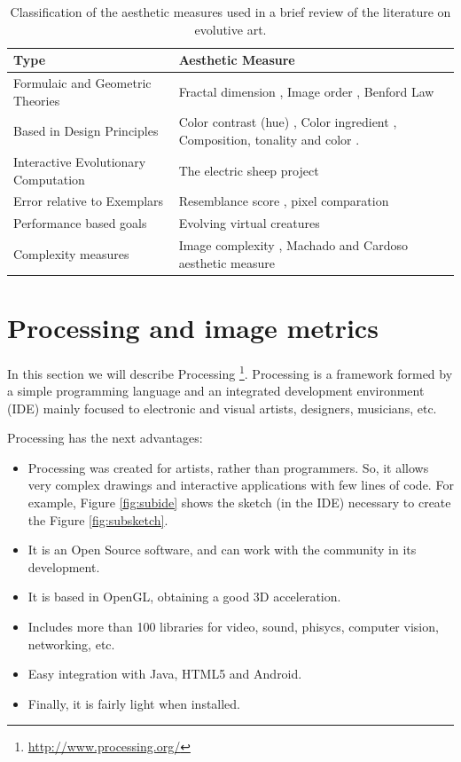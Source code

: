 \documentclass[conference]{IEEEtran}
\begin{document}
\begin{table}[!t] 
\caption{Classification of the aesthetic measures used in a brief review of the literature on evolutive art.} 
\label{table_class} 
\centering
\begin{tabular}{|l|l|}
\hline
Type & Aesthetic Measure \\ \hline
Formulaic and Geometric Theories & Fractal dimension \cite{den2010comparing}, Image order \cite{li2012investigating}, Benford Law \cite{del2005benford}\\ \hline
Based in Design Principles &  Color contrast (hue) \cite{den2012evolving},  Color ingredient \cite{li2012investigating}, Composition, tonality and color \cite{dipaola2009incorporating}.\\ \hline
Interactive Evolutionary Computation & The electric sheep project \cite{draves2006electric} \\ \hline
Error relative to Exemplars &  Resemblance score \cite{dipaola2009incorporating}, pixel comparation \cite{aguilar2008robotic}\\ \hline
Performance based goals & Evolving virtual creatures \cite{sims1994evolving} \\\hline
Complexity measures & Image complexity \cite{li2012investigating}, Machado and Cardoso aesthetic measure \cite{machado1998computing}\\ \hline
\end{tabular}
\end{table}

\section{Processing and image metrics}
\label{sec:processing}
In this section we will describe Processing \footnote{\url{http://www.processing.org/}}. Processing \cite{PROCESSING} is a framework formed by a simple programming language and an integrated development environment (IDE) mainly focused to electronic and visual artists, designers, musicians, etc.

Processing has the next advantages:

\begin{itemize}
\item Processing was created for artists, rather than programmers. So, it allows very complex drawings and interactive applications with few lines of code. For example, Figure \ref{fig:subide} shows the sketch (in the IDE) necessary to create the Figure \ref{fig:subsketch}.
\item It is an Open Source software, and can work with the community in its development.
\item It is based in OpenGL, obtaining a good 3D acceleration.
\item Includes more than 100 libraries for video, sound, phisycs, computer vision, networking, etc.
\item Easy integration with Java, HTML5 and Android.
\item Finally, it is fairly light when installed.
\end{itemize}
\end{document}
